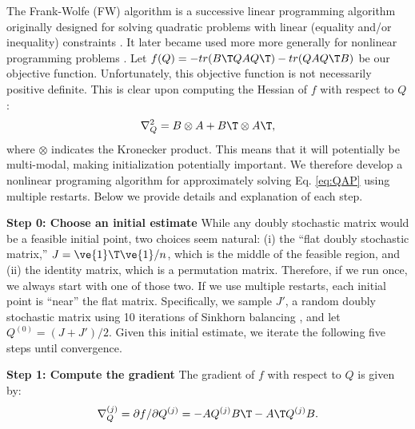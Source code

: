\documentclass[10pt,journal,cspaper,compsoc]{IEEEtran}
\begin{document}
The Frank-Wolfe (FW) algorithm 
is a successive linear programming algorithm 
 originally designed for solving quadratic problems with linear (equality and/or inequality) constraints \cite{Frank1956}. It later became used more more generally 
for nonlinear programming problems \cite{Bradley1977}.  
Let $f(Q)=- tr(B\T QAQ\T) - tr(QAQ\T B)$ be our objective function. Unfortunately, this objective function is not necessarily positive definite.  This is clear upon computing the Hessian of $f$  with respect to $Q$:
\begin{align}
	\nabla_Q^2  =  B \otimes A + B\T \otimes A\T,
\end{align}
where $\otimes$ indicates the Kronecker product. This means that it will potentially be multi-modal, making initialization potentially important.  We therefore develop a nonlinear programing algorithm for approximately solving Eq. \eqref{eq:QAP} using multiple restarts.  Below we provide details and explanation of each step.

\textbf{Step 0: Choose an initial estimate} While any doubly stochastic matrix would be a feasible initial point, two choices seem natural: (i) the ``flat doubly  stochastic matrix,'' $J=\ve{1}\T \ve{1}/n$, which is the middle of the feasible region, and (ii) the identity matrix, which is a permutation matrix.  Therefore, if we run \qap  once, we always start with one of those two.  If we use multiple restarts, each initial point is ``near'' the flat matrix.  Specifically, we sample $J'$, a random doubly stochastic matrix using 10 iterations of Sinkhorn balancing \cite{Sinkhorn1964}, and let $Q^{(0)}=(J+J')/2$. Given this initial estimate, we iterate the following five steps until convergence.

\textbf{Step 1: Compute the gradient} The gradient of $f$ with respect to $Q$ is given by:
\begin{align} \label{eq:grad}
	\nabla_Q^{(j)} = \partial f / \partial Q^{(j)} =  - A Q^{(j)} B\T - A\T Q^{(j)} B.
\end{align}

\end{document}
